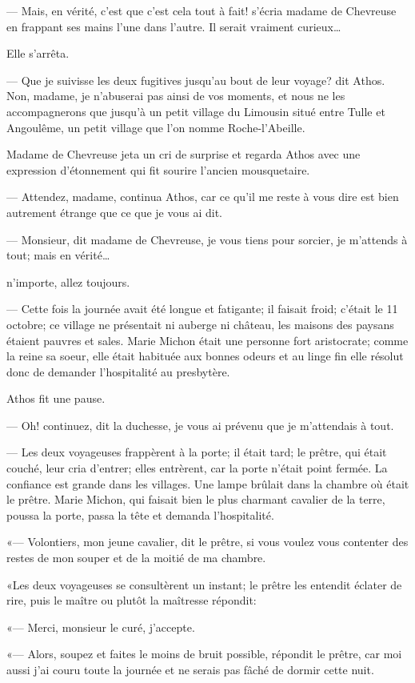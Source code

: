 — Mais, en vérité, c'est que c'est cela tout à fait! s'écria madame de Chevreuse en frappant ses mains l'une dans l'autre. Il serait vraiment curieux\dots

Elle s'arrêta.

— Que je suivisse les deux fugitives jusqu'au bout de leur voyage? dit Athos. Non, madame, je n'abuserai pas ainsi de vos moments, et nous ne les accompagnerons que jusqu'à un petit village du Limousin situé entre Tulle et Angoulême, un petit village que l'on nomme Roche-l'Abeille.

Madame de Chevreuse jeta un cri de surprise et regarda Athos avec une expression d'étonnement qui fit sourire l'ancien mousquetaire.

— Attendez, madame, continua Athos, car ce qu'il me reste à vous dire est bien autrement étrange que ce que je vous ai dit.

— Monsieur, dit madame de Chevreuse, je vous tiens pour sorcier, je m'attends à tout; mais en vérité\dots

n'importe, allez toujours.

— Cette fois la journée avait été longue et fatigante; il faisait froid; c'était le 11 octobre; ce village ne présentait ni auberge ni château, les maisons des paysans étaient pauvres et sales. Marie Michon était une personne fort aristocrate; comme la reine sa soeur, elle était habituée aux bonnes odeurs et au linge fin elle résolut donc de demander l'hospitalité au presbytère.

Athos fit une pause.

— Oh! continuez, dit la duchesse, je vous ai prévenu que je m'attendais à tout.

— Les deux voyageuses frappèrent à la porte; il était tard; le prêtre, qui était couché, leur cria d'entrer; elles entrèrent, car la porte n'était point fermée. La confiance est grande dans les villages. Une lampe brûlait dans la chambre où était le prêtre. Marie Michon, qui faisait bien le plus charmant cavalier de la terre, poussa la porte, passa la tête et demanda l'hospitalité.

«— Volontiers, mon jeune cavalier, dit le prêtre, si vous voulez vous contenter des restes de mon souper et de la moitié de ma chambre.

«Les deux voyageuses se consultèrent un instant; le prêtre les entendit éclater de rire, puis le maître ou plutôt la maîtresse répondit:

«— Merci, monsieur le curé, j'accepte.

«— Alors, soupez et faites le moins de bruit possible, répondit le prêtre, car moi aussi j'ai couru toute la journée et ne serais pas fâché de dormir cette nuit.

